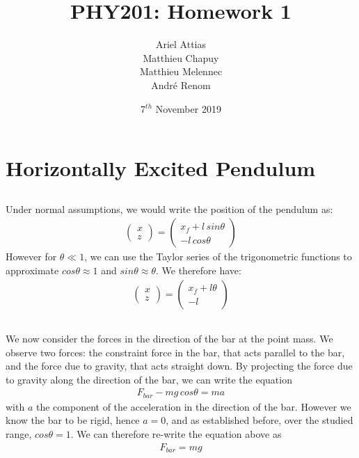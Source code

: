 \documentclass{article}
\title{PHY201: Homework 1}
\date{7$^{th}$ November 2019}
\author{Ariel Attias\\Matthieu Chapuy\\Matthieu Melennec\\Andr\'e Renom}
\begin{document}
	\maketitle
	\tableofcontents
	\newpage

\section{Horizontally Excited Pendulum}

\subsection{} %

Under normal assumptions, we would write the position of the pendulum as:
\begin{align*}
	\left( \begin{matrix} x \\ z \end{matrix} \right) = \left( \begin{matrix}x_f +  l\, sin\theta \\ -l\, cos\theta \end{matrix} \right)
\end{align*}
However for $\theta \ll 1$, we can use the Taylor series of the trigonometric functions to approximate $cos\theta \approx 1$ and $sin\theta \approx \theta$. We therefore have:
\begin{align*}
	\left( \begin{matrix} x \\ z \end{matrix} \right) = \left( \begin{matrix}x_f +  l\theta \\ -l \end{matrix} \right)
\end{align*}

\subsection{} %

We now consider the forces in the direction of the bar at the point mass. We observe two forces: the constraint force in the bar, that acts parallel to the bar, and the force due to gravity, that acts straight down. By projecting the force due to gravity along the direction of the bar, we can write the equation
\begin{align*}
	F_{bar} - mg\,cos\theta = ma
\end{align*}
with $a$ the component of the acceleration in the direction of the bar. However we know the bar to be rigid, hence $a = 0$, and as established before, over the studied range, $cos\theta = 1$. We can therefore re-write the equation above as
\begin{align*}
	F_{bar} = mg
\end{align*}
\end{document}
